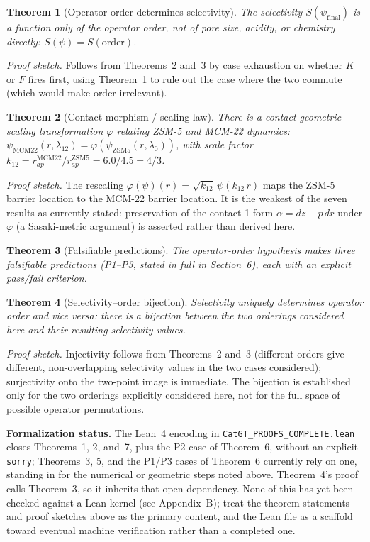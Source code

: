 \documentclass[11pt]{article}
\newtheorem{theorem}{Theorem}
\begin{document}
\begin{theorem}[Operator order determines selectivity]
The selectivity $S(\psi_{\mathrm{final}})$ is a function only of the operator order, not of pore size, acidity, or chemistry directly: $S(\psi) = S(\mathrm{order})$.
\end{theorem}
\emph{Proof sketch.} Follows from Theorems~2 and~3 by case exhaustion on whether $K$ or $F$ fires first, using Theorem~1 to rule out the case where the two commute (which would make order irrelevant).

\begin{theorem}[Contact morphism / scaling law]
There is a contact-geometric scaling transformation $\varphi$ relating ZSM-5 and MCM-22 dynamics: $\psi_{\mathrm{MCM22}}(r,\lambda_{12}) = \varphi(\psi_{\mathrm{ZSM5}}(r,\lambda_0))$, with scale factor $k_{12} = r_{ap}^{\mathrm{MCM22}}/r_{ap}^{\mathrm{ZSM5}} = 6.0/4.5 = 4/3$.
\end{theorem}
\emph{Proof sketch.} The rescaling $\varphi(\psi)(r) = \sqrt{k_{12}}\,\psi(k_{12}\,r)$ maps the ZSM-5 barrier location to the MCM-22 barrier location. It is the weakest of the seven results as currently stated: preservation of the contact 1-form $\alpha = dz - p\,dr$ under $\varphi$ (a Sasaki-metric argument) is asserted rather than derived here.

\begin{theorem}[Falsifiable predictions]
The operator-order hypothesis makes three falsifiable predictions (P1--P3, stated in full in Section~6), each with an explicit pass/fail criterion.
\end{theorem}

\begin{theorem}[Selectivity--order bijection]
Selectivity uniquely determines operator order and vice versa: there is a bijection between the two orderings considered here and their resulting selectivity values.
\end{theorem}
\emph{Proof sketch.} Injectivity follows from Theorems~2 and~3 (different orders give different, non-overlapping selectivity values in the two cases considered); surjectivity onto the two-point image is immediate. The bijection is established only for the two orderings explicitly considered here, not for the full space of possible operator permutations.

\bigskip
\noindent\textbf{Formalization status.} The Lean~4 encoding in \texttt{CatGT\_PROOFS\_COMPLETE.lean} closes Theorems~1, 2, and~7, plus the P2 case of Theorem~6, without an explicit \texttt{sorry}; Theorems~3, 5, and the P1/P3 cases of Theorem~6 currently rely on one, standing in for the numerical or geometric steps noted above. Theorem~4's proof calls Theorem~3, so it inherits that open dependency. None of this has yet been checked against a Lean kernel (see Appendix~B); treat the theorem statements and proof sketches above as the primary content, and the Lean file as a scaffold toward eventual machine verification rather than a completed one.
\end{document}
